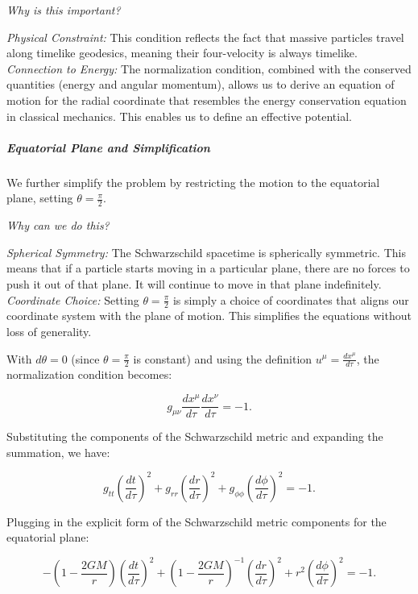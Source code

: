 \textit{Why is this important?}

\textit{Physical Constraint:} This condition reflects the fact that massive particles travel along timelike geodesics, meaning their four-velocity is always timelike.\\
\textit{Connection to Energy:} The normalization condition, combined with the conserved quantities (energy and angular momentum), allows us to derive an equation of motion for the radial coordinate that resembles the energy conservation equation in classical mechanics. This enables us to define an effective potential.

\subparagraph{Equatorial Plane and Simplification}

We further simplify the problem by restricting the motion to the equatorial plane, setting \(\theta = \frac{\pi}{2}\).

\textit{Why can we do this?}

\textit{Spherical Symmetry:} The Schwarzschild spacetime is spherically symmetric. This means that if a particle starts moving in a particular plane, there are no forces to push it out of that plane. It will continue to move in that plane indefinitely.
\textit{Coordinate Choice:} Setting \(\theta = \frac{\pi}{2}\) is simply a choice of coordinates that aligns our coordinate system with the plane of motion. This simplifies the equations without loss of generality.

With \(d\theta = 0\) (since \(\theta = \frac{\pi}{2}\) is constant) and using the definition \(u^\mu = \frac{dx^\mu}{d\tau}\), the normalization condition becomes:

\begin{equation}
g_{\mu\nu} \frac{dx^\mu}{d\tau} \frac{dx^\nu}{d\tau} = -1.
\end{equation}

Substituting the components of the Schwarzschild metric and expanding the summation, we have:

\begin{equation}
g_{tt}\left(\frac{dt}{d\tau}\right)^2 + g_{rr}\left(\frac{dr}{d\tau}\right)^2 + g_{\phi\phi}\left(\frac{d\phi}{d\tau}\right)^2 = -1.
\end{equation}

Plugging in the explicit form of the Schwarzschild metric components for the equatorial plane:

\begin{equation}
-\left(1 - \frac{2GM}{r}\right)\left(\frac{dt}{d\tau}\right)^2 + \left(1 - \frac{2GM}{r}\right)^{-1} \left(\frac{dr}{d\tau}\right)^2 + r^2 \left(\frac{d\phi}{d\tau}\right)^2 = -1.
\end{equation}

